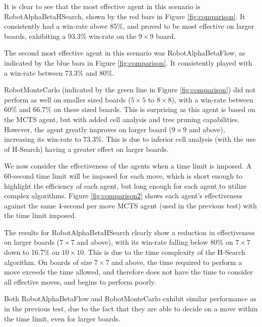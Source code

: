 It is clear to see that the most effective agent in this scenario is RobotAlphaBetaHSearch, shown by the red bars in Figure \ref{fig:comparison}. It consistently had a win-rate above 85\%, and proved to be most effective on larger boards, exhibiting a 93.3\% win-rate on the $9\times9$ board. 


The second most effective agent in this scenario was RobotAlphaBetaFlow, as indicated by the blue bars in Figure \ref{fig:comparison}. It consistently played with a win-rate between 73.3\% and 80\%.

RobotMonteCarlo (indicated by the green line in Figure \ref{fig:comparison}) did not perform as well on smaller sized boards ($5\times5$ to $8\times8$), with a win-rate between 60\% and 66.7\% on these sized boards. This is surprising as this agent is based on the MCTS agent, but with added cell analysis and tree pruning capabilities. However, the agent greatly improves on larger board ($9\times9$ and above), increasing its win-rate to 73.3\%. This is due to inferior cell analysis (with the use of H-Search) having a greater effect on larger boards.














We now consider the effectiveness of the agents when a time limit is imposed. A 60-second time limit will be imposed for each move, which is short enough to highlight the efficiency of each agent, but long enough for each agent to utilize complex algorithms. Figure \ref{fig:comparison2} shows each agent's effectiveness against the same 4-second per move MCTS agent (used in the previous test) with the time limit imposed. 

The results for RobotAlphaBetaHSearch clearly show a reduction in effectiveness on larger boards ($7\times7$ and above), with its win-rate falling below 80\% on $7\times7$ down to 16.7\% on $10\times10$. This is due to the time complexity of the H-Search algorithm. On boards of size $7\times7$ and above, the time required to perform a move exceeds the time allowed, and therefore does not have the time to consider all effective moves, and begins to perform poorly.

Both RobotAlphaBetaFlow and RobotMonteCarlo exhibit similar performance as in the previous test, due to the fact that they are able to decide on a move within the time limit, even for larger boards.




